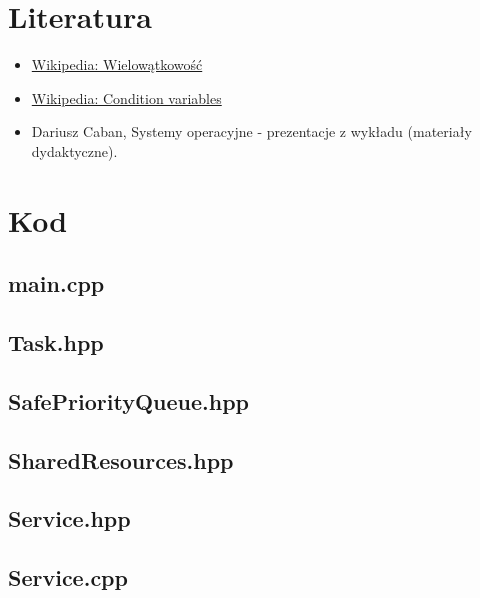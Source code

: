 \documentclass[a4paper,12pt]{article}
\begin{document}
    \section{Literatura}
        \vspace{0.5em}
        \begin{itemize}
            \item \href{https://pl.wikipedia.org/wiki/Wielow%C4%85tkowo%C5%9B%C4%87}{Wikipedia: Wielowątkowość}
            \item \href{https://en.wikipedia.org/wiki/Condition_variables}{Wikipedia: Condition variables}
            \item Dariusz Caban, Systemy operacyjne - prezentacje z wykładu (materiały dydaktyczne).
        \end{itemize}
    \newpage
    \vspace*{1em}
    \section{Kod}
        \vspace{0.5em}
        \subsection{main.cpp}
            
        \subsection{Task.hpp}
            
        \subsection{SafePriorityQueue.hpp}
            
        \subsection{SharedResources.hpp}
            
        \subsection{Service.hpp}
            
        \subsection{Service.cpp}
            
\end{document}
